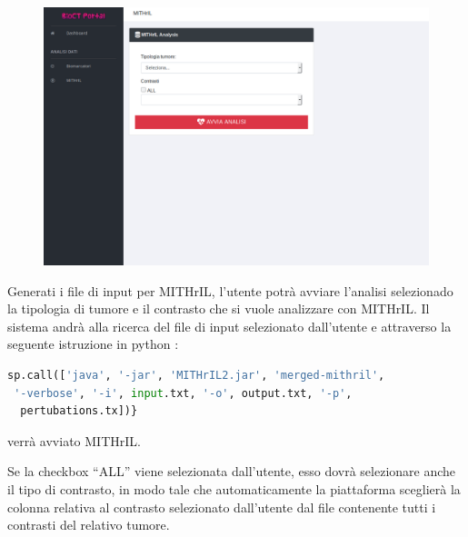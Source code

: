 \documentclass[10pt,a4paper]{report}
\newcommand{\virgolette}[1]{``#1''}
\begin{document}
\begin{figure}[H]
\centering%
\vspace{1ex}%
\includegraphics[scale=0.25]{mithril.png} 
\end{figure}

Generati i file di input per MITHrIL, l'utente potrà avviare l'analisi selezionado la tipologia di tumore e il contrasto che si vuole analizzare con MITHrIL. Il sistema andrà alla ricerca del file di input selezionato dall'utente e attraverso la seguente istruzione in python :

\begin{lstlisting}[frame=single, language=python]
sp.call(['java', '-jar', 'MITHrIL2.jar', 'merged-mithril',
 '-verbose', '-i', input.txt, '-o', output.txt, '-p',
  pertubations.tx])}
\end{lstlisting}
verrà avviato MITHrIL.

\newpage Se la checkbox \virgolette{ALL} viene selezionata dall'utente, esso dovrà selezionare anche il tipo di contrasto, in modo tale che automaticamente la piattaforma sceglierà la colonna relativa al contrasto selezionato dall'utente dal file contenente tutti i contrasti del relativo tumore.\\
\end{document}
